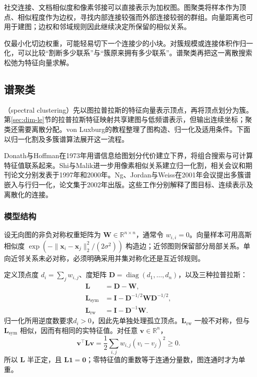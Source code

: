 社交连接、文档相似度和像素邻接可以直接表示为加权图。图聚类将样本作为顶点、相似程度作为边权，寻找内部连接较强而外部连接较弱的群组。向量距离也可用于建图；边权和邻域规则因此继续决定所保留的相似关系。

仅最小化切边权重，可能轻易切下一个连接少的小块。对簇规模或连接体积作归一化，可以比较“割断多少联系”与“簇原来拥有多少联系”。谱聚类再把这一离散搜索松弛为特征向量求解。

\subsection{谱聚类}
\label{sec:clustering-spectral}

（spectral clustering）先以图拉普拉斯的特征向量表示顶点，再将顶点划分为簇。第\ref{sec:dim-le}节的拉普拉斯特征映射共享建图与低频谱表示，但输出连续坐标；聚类还需要离散分配。von Luxburg的教程整理了图构造、归一化及适用条件。下面以归一化割及多簇谱算法展开这一流程。

Donath与Hoffman在1973年用谱信息给图划分代价建立下界，将组合搜索与可计算特征值联系起来。Shi与Malik进一步用像素相似关系建立归一化割，相关会议和期刊论文分别发表于1997年和2000年。Ng、Jordan与Weiss在2001年会议提出多簇谱嵌入与行归一化，论文集于2002年出版。这些工作分别解释了图目标、连续表示及离散化的连接。

\subsubsection{模型结构}

设无向图的非负对称权重矩阵为 $\bm{W}\in\mathbb{R}^{n\times n}$，通常令 $w_{i,i}=0$。向量样本可用高斯相似度 $\exp(-\lVert\bm{x}_i-\bm{x}_j\rVert_2^2/(2\sigma^2))$ 构造边；近邻图则保留部分局部关系。单向近邻关系未必对称，必须明确采用并集对称化还是互近邻规则。

定义顶点度 $d_i=\sum_jw_{i,j}$、度矩阵 $\bm{D}=\operatorname{diag}(d_1,\ldots,d_n)$，以及三种拉普拉斯：
\begin{align}
 \bm{L}&=\bm{D}-\bm{W},\nonumber\\
 \bm{L}_{\mathrm{sym}}
 &=\bm{I}-\bm{D}^{-1/2}\bm{W}\bm{D}^{-1/2},\nonumber\\
 \bm{L}_{\mathrm{rw}}
 &=\bm{I}-\bm{D}^{-1}\bm{W}.
 \label{eq:clustering-laplacians}
\end{align}
归一化所用逆度数要求$d_i>0$，因此先单独处理孤立顶点。$\bm{L}_{\mathrm{rw}}$ 一般不对称，但与 $\bm{L}_{\mathrm{sym}}$ 相似，因而有相同的实特征值。对任意 $\bm{v}\in\mathbb{R}^n$，
\begin{equation}
 \bm{v}^{\top}\bm{L}\bm{v}
 =\frac12\sum_{i,j}w_{i,j}(v_i-v_j)^2\geq0.
 \label{eq:clustering-laplacian-form}
\end{equation}
所以 $\bm{L}$ 半正定，且 $\bm{L}\bm{1}=\bm{0}$；零特征值的重数等于连通分量数，图连通时才为单重。

